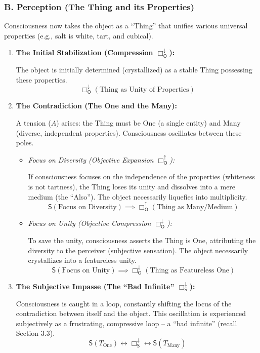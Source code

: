 \documentclass[12pt]{book}
\newcommand{\SBoxDown}{\Box_{\mathsf{S}}^{\downarrow}}
\newcommand{\OBoxUp}{\Box_{\mathsf{O}}^{\uparrow}}
\newcommand{\OBoxDown}{\Box_{\mathsf{O}}^{\downarrow}}
\begin{document}
\subsubsection{B. Perception (The Thing and its Properties)}

Consciousness now takes the object as a ``Thing'' that unifies various universal properties (e.g., salt is white, tart, and cubical).

\begin{enumerate}
\item \textbf{The Initial Stabilization (Compression $\OBoxDown$):}

The object is initially determined (crystallized) as a stable Thing possessing these properties.
\[
\OBoxDown(\text{Thing as Unity of Properties})
\]

\item \textbf{The Contradiction (The One and the Many):}

A tension ($A$) arises: the Thing must be One (a single entity) and Many (diverse, independent properties). Consciousness oscillates between these poles.

\begin{itemize}
\item \textit{Focus on Diversity (Objective Expansion $\OBoxUp$):}

If consciousness focuses on the independence of the properties (whiteness is not tartness), the Thing loses its unity and dissolves into a mere medium (the ``Also''). The object necessarily liquefies into multiplicity.
\[
\mathsf{S}(\text{Focus on Diversity}) \implies \OBoxUp(\text{Thing as Many/Medium})
\]

\item \textit{Focus on Unity (Objective Compression $\OBoxDown$):}

To save the unity, consciousness asserts the Thing is One, attributing the diversity to the perceiver (subjective sensation). The object necessarily crystallizes into a featureless unity.
\[
\mathsf{S}(\text{Focus on Unity}) \implies \OBoxDown(\text{Thing as Featureless One})
\]
\end{itemize}

\item \textbf{The Subjective Impasse (The ``Bad Infinite'' $\SBoxDown$):}

Consciousness is caught in a loop, constantly shifting the locus of the contradiction between itself and the object. This oscillation is experienced subjectively as a frustrating, compressive loop -- a ``bad infinite'' (recall Section 3.3).
\[
\mathsf{S}(T_{\text{One}}) \leftrightarrow \SBoxDown \leftrightarrow \mathsf{S}(T_{\text{Many}})
\]


\end{enumerate}
\end{document}
